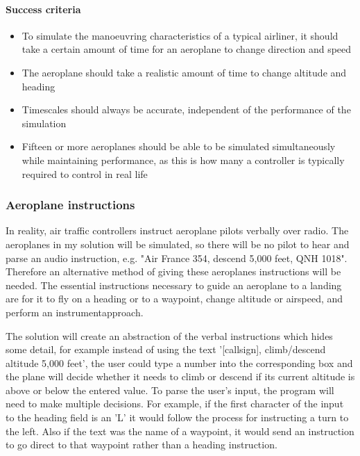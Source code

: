 \documentclass{article}
\begin{document}
\paragraph{Success criteria}
\begin{itemize}
    \item To simulate the manoeuvring characteristics of a typical airliner, it should take a certain amount of time for an aeroplane to change direction and speed
    \item The aeroplane should take a realistic amount of time to change altitude and heading
    \item Timescales should always be accurate, independent of the performance of the simulation
    \item Fifteen or more aeroplanes should be able to be simulated simultaneously while maintaining performance, as this is how many a controller is typically required to control in real life
\end{itemize}

\subsubsection{Aeroplane instructions}
In reality, air traffic controllers instruct aeroplane pilots verbally over radio.
The aeroplanes in my solution will be simulated, so there will be no pilot to hear and parse an audio instruction, e.g. "Air France 354, descend 5,000 feet, QNH 1018".
Therefore an alternative method of giving these aeroplanes instructions will be needed.
The essential instructions necessary to guide an aeroplane to a landing are for it to fly on a \gls{heading} or to a \gls{waypoint}, change altitude or \gls{airspeed}, and perform an \gls{instrumentapproach}.

The solution will create an abstraction of the verbal instructions which hides some detail, for example instead of using the text '[callsign], climb/descend altitude 5,000 feet', the user could type a number into the corresponding box and the plane will decide whether it needs to climb or descend if its current altitude is above or below the entered value.
To parse the user's input, the program will need to make multiple decisions.
For example, if the first character of the input to the heading field is an 'L' it would follow the process for instructing a turn to the left.
Also if the text was the name of a waypoint, it would send an instruction to go direct to that waypoint rather than a heading instruction.
\end{document}
